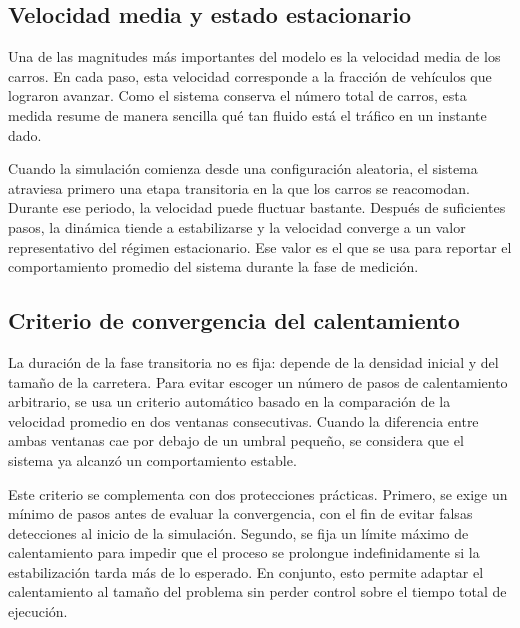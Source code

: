 \subsection{Velocidad media y estado estacionario}

Una de las magnitudes más importantes del modelo es la velocidad media de los carros. En cada paso, esta velocidad corresponde a la fracción de vehículos que lograron avanzar. Como el sistema conserva el número total de carros, esta medida resume de manera sencilla qué tan fluido está el tráfico en un instante dado.

Cuando la simulación comienza desde una configuración aleatoria, el sistema atraviesa primero una etapa transitoria en la que los carros se reacomodan. Durante ese periodo, la velocidad puede fluctuar bastante. Después de suficientes pasos, la dinámica tiende a estabilizarse y la velocidad converge a un valor representativo del régimen estacionario. Ese valor es el que se usa para reportar el comportamiento promedio del sistema durante la fase de medición.

\subsection{Criterio de convergencia del calentamiento}

La duración de la fase transitoria no es fija: depende de la densidad inicial y del tamaño de la carretera. Para evitar escoger un número de pasos de calentamiento arbitrario, se usa un criterio automático basado en la comparación de la velocidad promedio en dos ventanas consecutivas. Cuando la diferencia entre ambas ventanas cae por debajo de un umbral pequeño, se considera que el sistema ya alcanzó un comportamiento estable.

Este criterio se complementa con dos protecciones prácticas. Primero, se exige un mínimo de pasos antes de evaluar la convergencia, con el fin de evitar falsas detecciones al inicio de la simulación. Segundo, se fija un límite máximo de calentamiento para impedir que el proceso se prolongue indefinidamente si la estabilización tarda más de lo esperado. En conjunto, esto permite adaptar el calentamiento al tamaño del problema sin perder control sobre el tiempo total de ejecución.

